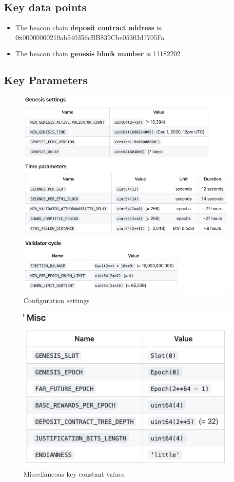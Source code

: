\documentclass[UTF8]{article}
\begin{document}
\subsection{Key data points}
\begin{itemize}
\item The beacon chain \textbf{deposit contract address} is: 0x00000000219ab540356cBB839Cbe05303d7705Fa 
\item The beacon chain \textbf{genesis block number} is 11182202
\end{itemize}

 \subsection{Key Parameters }
\begin{figure}[htbp]
\begin{center}
\includegraphics[width=0.9\linewidth]{images/configvalues}
\caption{Configuration settings}
\label{fig:config}
\end{center}
\end{figure}

\begin{figure}[htbp]
\begin{center}
\includegraphics[width=0.4\linewidth]{images/constants}
\caption{Miscellaneous key constant values}
\label{fig:constants}
\end{center}
\end{figure}
\end{document}
